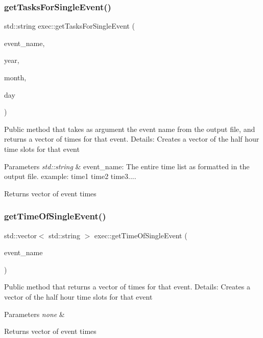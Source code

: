 \subsubsection{\texorpdfstring{get\+Tasks\+For\+Single\+Event()}{getTasksForSingleEvent()}}
{\footnotesize\ttfamily std\+::string exec\+::get\+Tasks\+For\+Single\+Event (\begin{DoxyParamCaption}\item[{std\+::string}]{event\+\_\+name,  }\item[{std\+::string}]{year,  }\item[{std\+::string}]{month,  }\item[{std\+::string}]{day }\end{DoxyParamCaption})}

Public method that takes as argument the event name from the output file, and returns a vector of times for that event. Details\+: Creates a vector of the half hour time slots for that event 
\begin{DoxyParams}{Parameters}
{\em std\+::string} & event\+\_\+name\+: The entire time list as formatted in the output file. example\+: time1 time2 time3.... \\
\hline
\end{DoxyParams}
\begin{DoxyReturn}{Returns}
vector of event times 
\end{DoxyReturn}
\mbox{\label{classexec_aa81946a7084e58b434cbbb3f41d646af}} 
\subsubsection{\texorpdfstring{get\+Time\+Of\+Single\+Event()}{getTimeOfSingleEvent()}}
{\footnotesize\ttfamily std\+::vector$<$ std\+::string $>$ exec\+::get\+Time\+Of\+Single\+Event (\begin{DoxyParamCaption}\item[{std\+::string}]{event\+\_\+name }\end{DoxyParamCaption})}

Public method that returns a vector of times for that event. Details\+: Creates a vector of the half hour time slots for that event 
\begin{DoxyParams}{Parameters}
{\em none} & \\
\hline
\end{DoxyParams}
\begin{DoxyReturn}{Returns}
vector of event times 
\end{DoxyReturn}
\mbox{\label{classexec_ade14fc20cd40b2d5e3e8e5abbda382d4}} 
